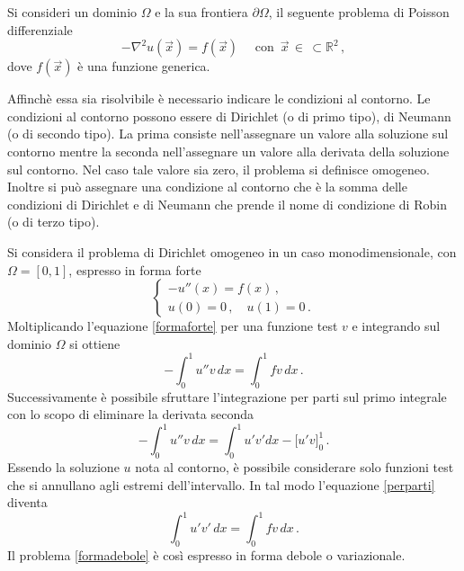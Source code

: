 Si consideri un dominio $\Omega$ e la sua frontiera $\partial \Omega$, il seguente problema di Poisson differenziale
\begin{equation}
 -\nabla^{2}u(\vec{x}) = f(\vec{x}) \quad \text{ con } \, \vec{x} \, \in \, \subset \mathbb{R}^{2} \,,
\end{equation}
dove $f(\vec{x})$ è una funzione generica.

Affinchè essa sia risolvibile è necessario indicare le condizioni 
al contorno. Le condizioni al contorno possono essere di Dirichlet
(o di primo tipo), di Neumann (o di secondo tipo). La prima consiste
nell'assegnare un valore alla soluzione sul contorno mentre 
la seconda nell'assegnare un valore alla derivata della soluzione sul contorno.
Nel caso tale valore sia zero, il problema si definisce omogeneo. 
Inoltre si può assegnare una condizione al contorno che è la somma 
delle condizioni di Dirichlet e di Neumann che prende il nome di
condizione di Robin (o di terzo tipo).

Si considera il problema di Dirichlet omogeneo in un caso
monodimensionale, con $\Omega=[0,1]$, espresso in forma forte
\begin{equation}
\label{formaforte}
 \begin{cases}
  -u''(x)=f(x) \,, \\
  u(0)=0 \,, \quad  u(1)=0 \,.
 \end{cases}
\end{equation}
Moltiplicando l'equazione \eqref{formaforte} per una funzione 
test $v$ e integrando sul dominio $\Omega$ si ottiene
\begin{equation}
 -\int_{0}^{1}u''v \,dx=\int_{0}^{1}fv \, dx \, .
\end{equation}
Successivamente è possibile sfruttare l'integrazione per 
parti sul primo integrale con lo scopo di eliminare la derivata seconda
\begin{equation}
\label{perparti}
 -\int_{0}^{1}u''v \, dx=\int_{0}^{1}u'v'dx-\bigl[u'v \bigr]_{0}^{1} \, .
\end{equation}
Essendo la soluzione $u$ nota al contorno, è possibile
considerare solo funzioni test che si annullano agli estremi
dell'intervallo. In tal modo l'equazione \eqref{perparti} diventa
\begin{equation}
\label{formadebole}
 \int_{0}^{1}u'v'\,dx=\int_{0}^{1}fv \,dx \, .
\end{equation}
Il problema \eqref{formadebole} è così espresso in forma debole o variazionale.

